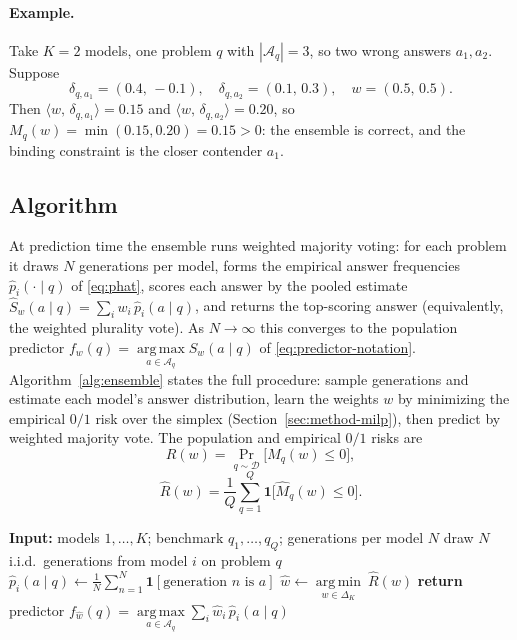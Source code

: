 \documentclass{article} %
\providecommand{\argmax}{\mathop{\mathrm{arg\,max}}\limits}
\providecommand{\argmin}{\mathop{\mathrm{arg\,min}}\limits}
\providecommand{\D}{\mathcal{D}}
\providecommand{\Aq}{\mathcal{A}_q}
\providecommand{\simplex}{\Delta_K}
\providecommand{\Risk}{R}
\providecommand{\eRisk}{\widehat{R}}
\providecommand{\ip}[2]{\langle #1,\, #2\rangle}
\providecommand{\phat}{\widehat{p}}
\providecommand{\Mhat}{\widehat{M}}
\begin{document}
\paragraph{Example.}
Take $K=2$ models, one problem $q$ with $|\Aq|=3$, so two wrong answers
$a_1,a_2$. Suppose
\begin{equation}
\label{eq:wex1}
\delta_{q,a_1} = (0.4,\,-0.1),\quad
\delta_{q,a_2} = (0.1,\,0.3),\quad
w = (0.5,\,0.5).
\end{equation}
Then $\ip{w}{\delta_{q,a_1}} = 0.15$ and $\ip{w}{\delta_{q,a_2}} = 0.20$, so
$M_q(w) = \min(0.15,0.20) = 0.15 > 0$: the ensemble is correct, and the binding
constraint is the closer contender $a_1$.
\subsection{Algorithm}
\label{sec:method-framing}

At prediction time the ensemble runs weighted majority voting: for each problem
it draws $N$ generations per model, forms the empirical answer frequencies
$\phat_i(\cdot\mid q)$ of \eqref{eq:phat}, scores each answer by the pooled
estimate $\widehat S_w(a\mid q)=\sum_i w_i\,\phat_i(a\mid q)$, and returns the
top-scoring answer (equivalently, the weighted plurality vote). As $N\to\infty$
this converges to the population predictor
$f_w(q)=\argmax_{a\in\Aq} S_w(a\mid q)$ of \eqref{eq:predictor-notation}.
Algorithm~\ref{alg:ensemble} states the full procedure: sample generations and
estimate each model's answer distribution, learn the weights $w$ by minimizing
the empirical $0/1$ risk over the simplex (Section~\ref{sec:method-milp}), then
predict by weighted majority vote. The population and empirical $0/1$ risks are
\begin{equation}
\label{eq:R}
\Risk(w) = \Pr_{q\sim\D}\!\big[M_q(w)\le 0\big],
\end{equation}
\begin{equation}
\label{eq:Rhat}
\eRisk(w) = \frac1Q\sum_{q=1}^Q \mathbf 1\!\big[\Mhat_q(w)\le 0\big].
\end{equation}


\begin{algorithm}[t]
\caption{Convex-weighted ensemble by majority voting}
\label{alg:ensemble}
\begin{algorithmic}[1]
\STATE \textbf{Input:} models $1,\dots,K$; benchmark $q_1,\dots,q_Q$; generations per model $N$
  \STATE draw $N$ i.i.d.\ generations from model $i$ on problem $q$
  \STATE $\phat_i(a\mid q) \leftarrow \tfrac1N\sum_{n=1}^N \mathbf 1[\text{generation }n\text{ is }a]$ \hfill{}
\ENDFOR
\STATE $\hat w \leftarrow \argmin_{w\in\simplex}\ \eRisk(w)$ \hfill{}
\STATE \textbf{return} predictor $f_{\hat w}(q)=\argmax_{a\in\Aq}\sum_i \hat w_i\,\phat_i(a\mid q)$ \hfill{}
\end{algorithmic}
\end{algorithm}
\end{document}

